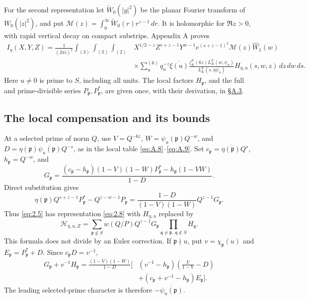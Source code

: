 \documentclass[11pt,a4paper]{article}
\begin{document}
For the second representation let \(\widetilde W_0(|y|^2)\) be the planar Fourier transform of \(W_0(|z|^2)\), and put \(\mathscr M(z)=\int_0^\infty\widetilde W_0(r)r^{z-1}\,dr\). It is holomorphic for \(\Re z>0\), with rapid vertical decay on compact substrips. Appendix A proves \[
\begin{aligned}
 I_\eta(X,Y,Z)=\frac1{(2\pi i)^3}\int_{(3)}\int_{(3)}\int_{(2)}
 &X^{1/2-z}Z^{s+z-1}Y^{w-1}e^{(s+z-1)^2}
 \mathscr M(z)\widehat W_1(w)\\
 &\times\sum_u^{(6)}q_u^{-z}\overline{\xi(u)}
 \frac{\zeta_K^S(6z)L_K^S(w,\psi_u)}{L_K^S(s,\eta\overline{\psi_u})}
 H_{\eta,u}(s,w,z)\,dz\,dw\,ds.
\end{aligned}
\tag{2.8}\label{eq:2.8}
\] Here \(u\ne0\) is prime to \(S\), including all units. The local factors \(H_{\mathfrak p}\), and the full and prime-divisible series \(P_{\mathfrak p},P_{\mathfrak p}^*\), are given once, with their derivation, in \hyperref[sec:A.3]{§A.3}.

\subsection{The local compensation and its bounds}\label{sec:2.3}

At a selected prime of norm \(Q\), use \(V=Q^{-6z}\), \(W=\psi_u(\mathfrak p)Q^{-w}\), and \(D=\eta(\mathfrak p)\overline{\psi_u(\mathfrak p)}Q^{-s}\), as in the local table \eqref{eq:A.8}--\eqref{eq:A.9}. Set \(c_{\mathfrak p}=\overline{\eta(\mathfrak p)}Q^s\), \(h_{\mathfrak p}=Q^{-w}\), and \[
 G_{\mathfrak p}=
 \frac{(c_{\mathfrak p}-h_{\mathfrak p})(1-V)(1-W)P_{\mathfrak p}^*
       -h_{\mathfrak p}(1-VW)}{1-D}.
\tag{2.9}\label{eq:2.9}
\] Direct substitution gives \[
 \overline{\eta(\mathfrak p)}Q^{s+z-1}P_{\mathfrak p}^*-Q^{z-w-1}P_{\mathfrak p}
 =\frac{1-D}{(1-V)(1-W)}Q^{z-1}G_{\mathfrak p}.
\tag{2.10}\label{eq:2.10}
\] Thus \eqref{eq:2.5} has representation \eqref{eq:2.8} with \(H_{\eta,u}\) replaced by \[
 \mathcal H_{\eta,u,Z}=
 \sum_{\mathfrak p\notin S}w(Q/P)Q^{z-1}G_{\mathfrak p}
 \prod_{\mathfrak q\ne\mathfrak p,\ \mathfrak q\notin S}H_{\mathfrak q}.
\tag{2.11}\label{eq:2.11}
\] This formula does not divide by an Euler correction. If \(\mathfrak p\nmid u\), put \(v=\chi_{\mathfrak p}(u)\) and \(E_{\mathfrak p}=P_{\mathfrak p}^*+D\). Since \(c_{\mathfrak p}D=v^{-1}\), \[
\begin{aligned}
 G_{\mathfrak p}+v^{-1}H_{\mathfrak p}
 =\frac{(1-V)(1-W)}{1-D}\bigg[&(v^{-1}-h_{\mathfrak p})
 \left(\frac V{1-V}-D\right)\\
 &+(c_{\mathfrak p}+v^{-1}-h_{\mathfrak p})E_{\mathfrak p}\bigg].
\end{aligned}
\tag{2.12}\label{eq:2.12}
\] The leading selected-prime character is therefore \(-\overline{\psi_u(\mathfrak p)}\).
\end{document}
